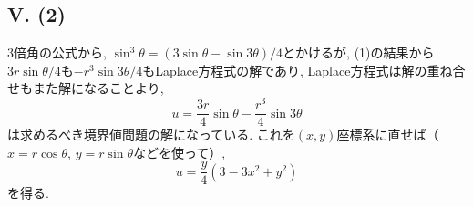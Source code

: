 \subsection*{V. (2)}
3倍角の公式から, $\sin^3{\theta}=(3\sin\theta-\sin{3\theta})/4$とかけるが, (1)の結果から$3r\sin{\theta}/4$も$-r^3\sin{3\theta}/4$もLaplace方程式の解であり, Laplace方程式は解の重ね合せもまた解になることより, 
\begin{equation}
  u=\frac{3r}{4}\sin{\theta}-\frac{r^3}{4}\sin{3\theta}
\end{equation}
は求めるべき境界値問題の解になっている. 
これを$(x,y)$座標系に直せば（$x=r\cos\theta$, $y=r\sin\theta$などを使って）,
\begin{equation}
  u=\frac{y}{4}(3-3x^2+y^2)
\end{equation} 
を得る. 



